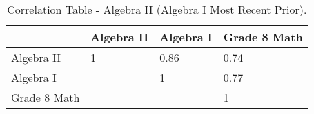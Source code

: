 \begin{table}[!tbp]
\caption{Correlation Table - Algebra II (Algebra I Most Recent Prior).\label{}} 
\begin{center}
\begin{tabular}{llll}
\hline\hline
\multicolumn{1}{l}{}&\multicolumn{1}{c}{Algebra II}&\multicolumn{1}{c}{Algebra I}&\multicolumn{1}{c}{Grade 8 Math}\tabularnewline
\hline
Algebra II&1&0.86&0.74\tabularnewline
Algebra I&&1&0.77\tabularnewline
Grade 8 Math&&&1\tabularnewline
\hline
\end{tabular}\end{center}
\end{table}
